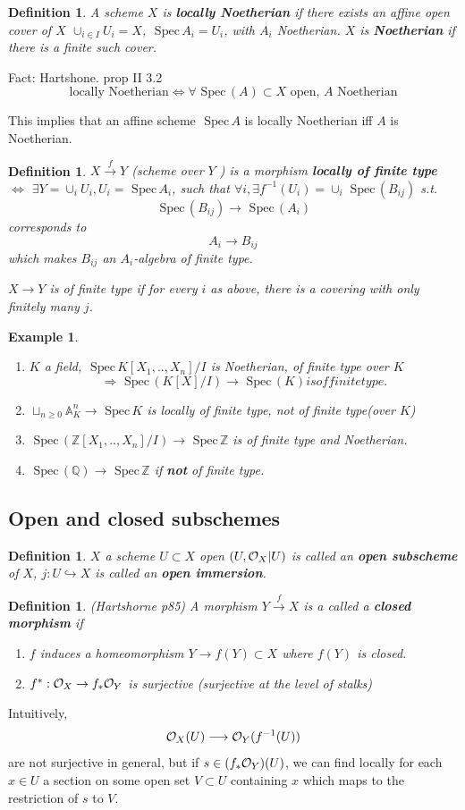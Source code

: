 \documentclass[11pt]{article}
\newtheorem{dfn}[thm]{Definition}
\newtheorem{ex}[thm]{Example}
\newcommand{\spec}{\text{ Spec}\,}
\newcommand{\affn}{\mathbb A}
\newcommand{\intg}{\mathbb Z}
\newcommand{\ratl}{\mathbb Q}
\newcommand{\calo}{{\cal O}}
\newcommand{\rta}{\rightarrow}
\newcommand{\Lrta}{\Longrightarrow}
\newcommand{\lrta}{\longrightarrow}
\newcommand{\Llrta}{\Longleftrightarrow}
\newcommand{\inj}{\hookrightarrow}
\begin{document}
\begin{dfn}
A scheme $X$ is \textbf{locally Noetherian} if there exists an affine open cover of $X$
$\cup_{i\in I} U_i=X$, $\spec A_i=U_i$, with $A_i$ Noetherian. $X$ is \textbf{Noetherian} if there is a  finite such cover.
\end{dfn}
Fact: Hartshone. prop II 3.2
$$
\text{locally Noetherian}\Llrta \forall \spec(A)\subset X \text{ open, } A \text{ Noetherian}
$$

This implies that an affine scheme $\spec A$ is locally Noetherian iff $A$ is Noetherian.

\begin{dfn}
$X\overset{f}{\lrta } Y$ (scheme over $Y$ ) is a morphism \textbf{locally of finite type} $\Llrta$ $\exists Y=\cup_i U_i, U_i=\spec A_i$, such that $\forall i, \exists f^{-1}(U_i)=\cup_i \spec(B_{ij})$ s.t.
$$
\spec(B_{ij})\lrta \spec(A_i)
$$
corresponds to 
$$
A_i\lrta B_{ij}
$$
which makes $B_{ij}$ an $A_i$-algebra of finite type.

$X\lrta Y$ is of finite type if for every $i$ as above, there is a covering with only finitely many $j$.
\end{dfn}
\begin{ex}\ 
\begin{enumerate}[label=(\arabic*)]
\item $K$ a field, $\spec K[X_1,..,X_n]/I$ is Noetherian, of finite type over $K$
$$
\Lrta \spec(K[X]/I)\lrta \spec(K) is of finite type.
$$
\item $\sqcup_{n\geq 0}\affn^n_K\lrta \spec K$ is locally of finite type, not of finite type(over $K$)
\item $\spec (\intg[X_1,..,X_n]/I)\lrta\spec \intg$ is of finite type and Noetherian.
\item $\spec(\ratl)\lrta \spec \intg$ if \textbf{not} of finite type.
\end{enumerate}
\end{ex}
\subsection{Open and closed subschemes}
\begin{dfn}
$X$ a scheme $U\subset X$ open $(U,\calo_X|U)$ is called an \textbf{open subscheme} of $X$, $j:U\inj  X$ is called an \textbf{open immersion}.
\end{dfn}
\begin{dfn}
(Hartshorne p85) A morphism $Y\overset{f}{\lrta}X$ is a called a \textbf{closed morphism} if 
\begin{enumerate}[label=(\arabic*)]
\item $f$ induces a homeomorphism $Y\lrta f(Y)\subset X$ where $f(Y)$  is closed.
\item
$f^*:\calo_X\rta f_*\calo_Y$ is surjective (surjective at the level of stalks)
\end{enumerate}
\end{dfn}
Intuitively,
$$
\calo_X(U)\lrta \calo_Y(f^{-1}(U))
$$
are not surjective  in general, but  if $s\in(f_*\calo_Y)(U)$, we can find locally  for each $x\in U$ a section  on some open set $V\subset U$ containing $x$ which maps to the restriction of $s$ to $V$.
\end{document}
